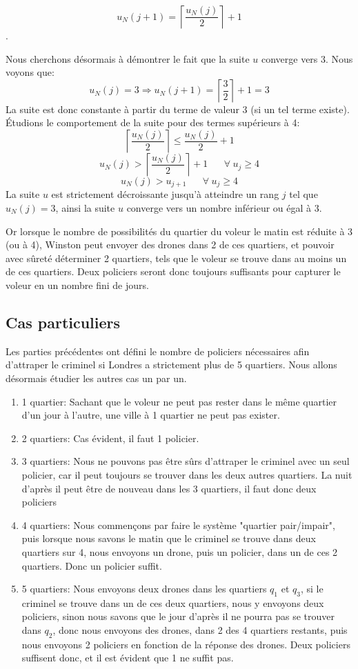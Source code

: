 $$u_{N}(j+1)=\left\lceil{\dfrac{u_N(j)}{2}}\right\rceil+1$$.

Nous cherchons désormais à démontrer le fait que la suite $u$ converge vers $3$. Nous voyons que: 
$$u_N(j)=3\Rightarrow u_N(j+1)=\left\lceil{\dfrac{3}{2}}\right\rceil+1=3$$
La suite est donc constante à partir du terme de valeur 3 (si un tel terme existe).
Étudions le comportement de la suite pour des termes supérieurs à 4:
$$\left\lceil{\dfrac{u_N(j)}{2}}\right\rceil\leq \dfrac{u_N(j)}{2}+1$$
$$u_N(j)>\left\lceil{\dfrac{u_N(j)}{2}}\right\rceil+1\hspace{20pt} \forall \hspace{3pt} {u_j\geq 4}$$
$$u_N(j)> u_{j+1} \hspace{20pt} \forall \hspace{3pt} {u_j\geq 4}$$
La suite $u$ est strictement décroissante jusqu'à atteindre un rang $j$ tel que $u_N(j)=3$, ainsi la suite $u$ converge vers un nombre inférieur ou égal à $3$.

Or lorsque le nombre de possibilités du quartier du voleur le matin est réduite à 3 (ou à 4), Winston peut envoyer des drones dans 2 de ces quartiers, et pouvoir avec sûreté déterminer 2 quartiers, tels que le voleur se trouve dans au moins un de ces quartiers. Deux policiers seront donc toujours suffisants pour capturer le voleur en un nombre fini de jours.

\subsection{Cas particuliers}
Les parties précédentes ont défini le nombre de policiers nécessaires afin d'attraper le criminel si Londres a strictement plus de 5 quartiers. Nous allons désormais étudier les autres cas un par un.
\begin{enumerate}
    \item 1 quartier: Sachant que le voleur ne peut pas rester dans le même quartier d'un jour à l'autre, une ville à 1 quartier ne peut pas exister.
    \item 2 quartiers: Cas évident, il faut 1 policier.
    \item 3 quartiers: Nous ne pouvons pas être sûrs d'attraper le criminel avec un seul policier, car il peut toujours se trouver dans les deux autres quartiers. La nuit d'après il peut être de nouveau dans les 3 quartiers, il faut donc deux policiers
    \item 4 quartiers: Nous commençons par faire le système "quartier pair/impair", puis lorsque nous savons le matin que le criminel se trouve dans deux quartiers sur 4, nous envoyons un drone, puis un policier, dans un de ces 2 quartiers. Donc un policier suffit.
    \item 5 quartiers: Nous envoyons deux drones dans les quartiers $q_1$ et $q_3$, si le criminel se trouve dans un de ces deux quartiers, nous y envoyons deux policiers, sinon nous savons que le jour d'après il ne pourra pas se trouver dans $q_2$, donc nous envoyons des drones, dans 2 des 4 quartiers restants, puis nous envoyons 2 policiers en fonction de la réponse des drones. Deux policiers suffisent donc, et il est évident que 1 ne suffit pas.
\end{enumerate}

